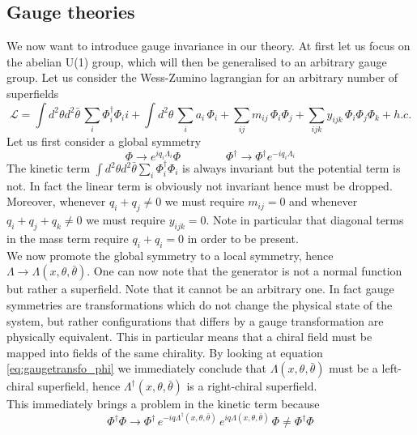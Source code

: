 \documentclass[12pt]{article}
\begin{document}
\subsection*{Gauge theories}
We now want to introduce gauge invariance in our theory. At first let us focus on the abelian U(1) group, which will then be generalised to an arbitrary gauge group. 
Let us consider the Wess-Zumino lagrangian for an arbitrary number of superfields
\begin{equation*}
  \mathcal{L} = \int d^2\theta d^2\bar\theta \, \sum_i \Phi_i^\dagger \Phi_ii + \int d^2\theta \, \sum_i a_i \, \Phi_i + \sum_{ij} m_{ij} \, \Phi_i\Phi_j + \sum_{ijk} y_{ijk} \, \Phi_i\Phi_j\Phi_k + h.c.
\end{equation*}
Let us first consider 
a global symmetry
\begin{equation}
  \Phi \to e^{iq_i \Lambda_i}\Phi \qquad \qquad \Phi^\dagger \to \Phi^\dagger e^{-iq_i \Lambda_i}
  \label{eq:gaugetransf_phi}
\end{equation}
The kinetic term $\int d^2\theta d^2\bar\theta \sum_i \Phi_i^\dagger \Phi_i$ is always invariant but the potential term is not. In fact the linear term is obviously not invariant hence must be dropped. 
Moreover, whenever $q_i + q_j \neq 0$ we must require $m_{ij} = 0$ and whenever $q_i + q_j + q_k \neq 0$ we must require $y_{ijk} = 0$. Note in particular that diagonal terms in the mass term require $q_i + q_i = 0$ in order to be present. \\
We now promote the global symmetry to a local symmetry, hence $\Lambda \to \Lambda(x, \theta, \bar\theta)$. One can now note that the generator is not a normal function but rather a superfield. Note that it cannot be an arbitrary one. 
In fact gauge symmetries are transformations which do not change the physical state of the system, but rather configurations that differs by a gauge transformation are physically equivalent. This in particular means that a chiral field must be mapped into fields of the same chirality. 
By looking at equation \ref{eq:gaugetransfo_phi} we immediately conclude that $\Lambda(x, \theta, \bar\theta)$ must be a left-chiral superfield, hence $\Lambda^\dagger(x, \theta, \bar\theta)$ is a right-chiral superfield. \\
This immediately brings a problem in the kinetic term because 
\begin{equation*}
\Phi^\dagger \Phi \to \Phi^\dagger \, e^{-iq\Lambda^\dagger(x,\theta,\bar\theta)} \, e^{iq\Lambda(x,\theta,\bar\theta)} \, \Phi \neq \Phi^\dagger \Phi
\end{equation*}
\end{document}
